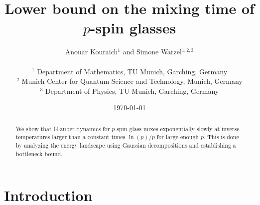 \documentclass[letterpaper, DIV=17]{scrartcl}
\numberwithin{equation}{section}
\theoremstyle{definition}
\begin{document}
		\title{Lower bound on the mixing time of $p$-spin glasses}
		
		\author{Anouar Kouraich$^{1}$ and  Simone Warzel$^{1,2,3}$ \\
			\\
			\small $^1$ Department of Mathematics, TU Munich, Garching, Germany \\[-.5ex]
			\small $^2$ Munich Center for Quantum Science and Technology, Munich, Germany \\[-.5ex]
			\small $^3$ Department of Physics, TU Munich, Garching, Germany}

        \date{\small \today \\[-.5cm]  }
		\maketitle		
		
		\begin{abstract}
			We show that Glauber dynamics for $ p$-spin glass mixes exponentially slowly at inverse temperatures larger than a constant times $ \ln (p)/p $ for large enough $ p $. This is done by analyzing the energy landscape using Gaussian decompositions and establishing a bottleneck bound.
		\end{abstract}
		
		
\section{Introduction}
%
\end{document}
